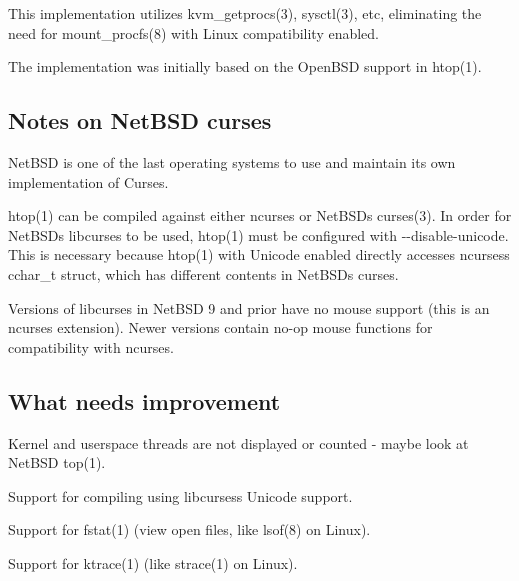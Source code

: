 This implementation utilizes kvm\+\_\+getprocs(3), sysctl(3), etc, eliminating the need for mount\+\_\+procfs(8) with Linux compatibility enabled.

The implementation was initially based on the Open\+B\+SD support in htop(1).

\subsection*{Notes on Net\+B\+SD curses }

Net\+B\+SD is one of the last operating systems to use and maintain its own implementation of Curses.

htop(1) can be compiled against either ncurses or Net\+B\+SD\textquotesingle{}s curses(3). In order for Net\+B\+SD\textquotesingle{}s libcurses to be used, htop(1) must be configured with {\ttfamily -\/-\/disable-\/unicode}. This is necessary because htop(1) with Unicode enabled directly accesses ncurses\textquotesingle{}s cchar\+\_\+t struct, which has different contents in Net\+B\+SD\textquotesingle{}s curses.

Versions of libcurses in Net\+B\+SD 9 and prior have no mouse support (this is an ncurses extension). Newer versions contain no-\/op mouse functions for compatibility with ncurses.

\subsection*{What needs improvement }


\begin{DoxyItemize}
\item Kernel and userspace threads are not displayed or counted -\/ maybe look at Net\+B\+SD top(1).
\item Support for compiling using libcurses\textquotesingle{}s Unicode support.
\item Support for fstat(1) (view open files, like lsof(8) on Linux).
\item Support for ktrace(1) (like strace(1) on Linux). 
\end{DoxyItemize}